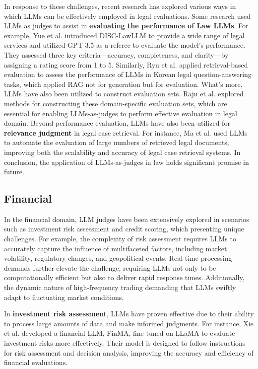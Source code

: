 In response to these challenges, recent research has explored various ways in which LLMs can be effectively employed in legal evaluations. Some research used LLMs as judges to assist in \textbf{evaluating the performance of Law LLMs}. For example, Yue et al. \cite{yue2023disc} introduced DISC-LawLLM to provide a wide range of legal services and utilized GPT-3.5 as a referee to evaluate the model’s performance. They assessed three key criteria—accuracy, completeness, and clarity—by assigning a rating score from 1 to 5. Similarly, Ryu et al. \cite{ryu2023retrieval} applied retrieval-based evaluation to assess the performance of LLMs in Korean legal question-answering tasks, which applied RAG not for generation but for evaluation. What's more, LLMs have also been utilized to construct evaluation sets. Raju et al. \cite{raju2024constructing} explored methods for constructing these domain-specific evaluation sets, which are essential for enabling LLMs-as-judges to perform effective evaluation in legal domain. Beyond performance evaluation, LLMs have also been utilized for \textbf{relevance judgment} in legal case retrieval. For instance, Ma et al. \cite{ma2024leveraging} used LLMs to automate the evaluation of large numbers of retrieved legal documents, improving both the scalability and accuracy of legal case retrieval systems. In conclusion, the application of LLMs-as-judges in law holds significant promise in future.


\subsection{Financial}
\label{sec:Financial}


In the financial domain, LLM judges have been extensively explored in scenarios such as investment risk assessment and credit scoring, which presenting unique challenges. For example, the complexity of risk assessment requires LLMs to accurately capture the influence of multifaceted factors, including market volatility, regulatory changes, and geopolitical events. Real-time processing demands further elevate the challenge, requiring LLMs not only to be computationally efficient but also to deliver rapid response times. Additionally, the dynamic nature of high-frequency trading demanding that LLMs swiftly adapt to fluctuating market conditions.



In \textbf{investment risk assessment}, LLMs have proven effective due to their ability to process large amounts of data and make informed judgments. For instance, Xie et al. \cite{xie2023pixiu} developed a financial LLM, FinMA, fine-tuned on LLaMA to evaluate investment risks more effectively. Their model is designed to follow instructions for risk assessment and decision analysis, improving the accuracy and efficiency of financial evaluations.

